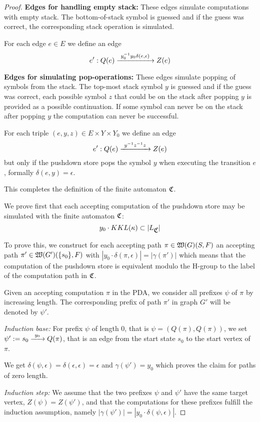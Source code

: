 \begin{proof}
\bigskip
{\bf Edges for handling empty stack:} These edges simulate computations with
empty stack. The bottom-of-stack symbol is guessed and if the guess was correct, the
corresponding stack operation is simulated.

For each edge $e \in E$ we define an edge
\[ e': Q(e) \xrightarrow{\ {y_0^{-1} y_0 \delta(e, \epsilon)}\ } Z(e) \] 

\bigskip
{\bf Edges for simulating pop-operations:} These edges simulate popping of
symbols from the stack.
The top-most stack symbol $y$ is guessed and if the guess was correct, each
possible symbol $z$ that could be on the stack after popping $y$ is provided as
a possible continuation. If some symbol can never be on the stack after
popping $y$ the computation can never be successful. 

For each triple $(e, y, z) \in E \times Y
\times Y_0$ we define an edge
\[ e': Q(e) \xrightarrow{\ {y^{-1} z^{-1} z}\ } Z(e) \]
but only if the pushdown store pops the symbol $y$ when executing the transition
$e$, formally $\delta(e, y) = \epsilon$.

\bigskip
This completes the definition of the finite automaton $\mbox{$\mathfrak{C}$}$.

We prove first that each accepting computation of the pushdown store may be
simulated with the finite automaton $\mbox{$\mathfrak{C}$}$:
\[ y_0 \cdot KKL(\kappa) \subset |L_{\mbox{$\mathfrak{C}$}}| \]

To prove this, we construct for each accepting path $\pi \in
\mbox{$\mathfrak{W}(G)$}(S,F)$ an accepting path $\pi' \in
\mbox{$\mathfrak{W}(G')$}(\mbox{$\{s_0\}$}, F)$ with $|y_0 \cdot \delta(\pi, \epsilon)| = |\gamma(\pi')|$ 
which means that the computation of the pushdown store is equivalent modulo the
H-group to the label of the computation path in $\mbox{$\mathfrak{C}$}$.

Given an accepting computation $\pi$ in the PDA, we consider all prefixes
$\psi$ of $\pi$ by increasing length. The corresponding prefix of path $\pi'$ in
graph $G'$ will be denoted by $\psi'$.

{\em Induction base:} For prefix $\psi$ of length 0, that is $\psi =
(Q(\pi), Q(\pi))$, we set $\psi' := s_0 \xrightarrow{\ {y_0}\ } Q(\pi)$, that
is an edge from the start state $s_0$ to the start vertex of $\pi$. 

We get $\delta(\psi, \epsilon) = \delta(\epsilon, \epsilon) = \epsilon$ and
$\gamma(\psi') = y_0$ which proves the claim for paths of zero length.

{\em Induction step:} We assume that the two prefixes $\psi$ and $\psi'$ have
the same target vertex, $Z(\psi) = Z(\psi')$, and that the computations for
these prefixes fulfill the induction assumption, namely $|\gamma(\psi')| =
|y_0 \cdot \delta(\psi, \epsilon)|$.


\end{proof}
